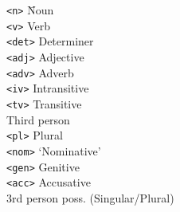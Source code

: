 \documentclass[a0paper,fontscale=0.3]{baposter}  %
\begin{document}
\begin{poster}
{\vspace{-1.5em}
\setlength{\columnsep}{-1em}
\setlength{\topsep}{-\parskip}
\begin{multicols}{3}
\begin{tabbing}
  \texttt{{\small <n>}}\hspace{3.0em} \=  Noun\\[-0.5ex]
  \texttt{{\small <v>}} \>  Verb\\[-0.5ex]
  \texttt{{\small <det>}} \>  Determiner\\[-0.5ex]
  \texttt{{\small <adj>}} \> Adjective\\[-0.5ex]
  \texttt{{\small <adv>}} \> Adverb\\[-0.5ex]
  \texttt{{\small <iv>}} \> Intransitive\\[-0.5ex]
  \texttt{{\small <tv>}} \> Transitive\\[-0.5ex]
  \texttt{{}} \> Third person\\[-0.5ex]
  \texttt{{\small <pl>}} \> Plural\\[-0.5ex]
  \texttt{{\small <nom>}} \> `Nominative'\\[-0.5ex]
  \texttt{{\small <gen>}} \> Genitive\\[-0.5ex]
  \texttt{{\small <acc>}} \> Accusative\\[-0.5ex]
  \texttt{{}} \> 3rd person poss. (Singular/Plural)\\[-0.5ex]

\end{tabbing}
\end{multicols}}
\end{poster}
\end{document}
